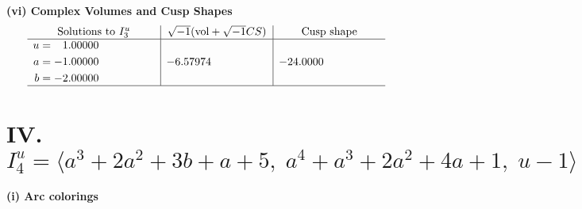 \documentclass[1p]{elsarticle_modified}
\theoremstyle{definition}
\newcommand{\I}{\sqrt{-1}}
\begin{document}
\newpage\flushleft \textbf{(vi) Complex Volumes and Cusp Shapes}
$$\begin{array}{c|c|c}  
\text{Solutions to }I^u_{3}& \I (\text{vol} + \sqrt{-1}CS) & \text{Cusp shape}\\
 \hline 
\begin{aligned}
u &= \phantom{-}1.00000\phantom{ +0.000000I} \\
a &= -1.00000\phantom{ +0.000000I} \\
b &= -2.00000\phantom{ +0.000000I}\end{aligned}
 & -6.57974\phantom{ +0.000000I} & -24.0000\phantom{ +0.000000I}\\
 \hline 
 \end{array}$$\newpage\newpage\renewcommand{\arraystretch}{1}
\centering \section*{IV. $I^u_{4}= \langle a^3+2 a^2+3 b+a+5,\;a^4+a^3+2 a^2+4 a+1,\;u-1 \rangle$}
\flushleft \textbf{(i) Arc colorings}\\
\end{document}
